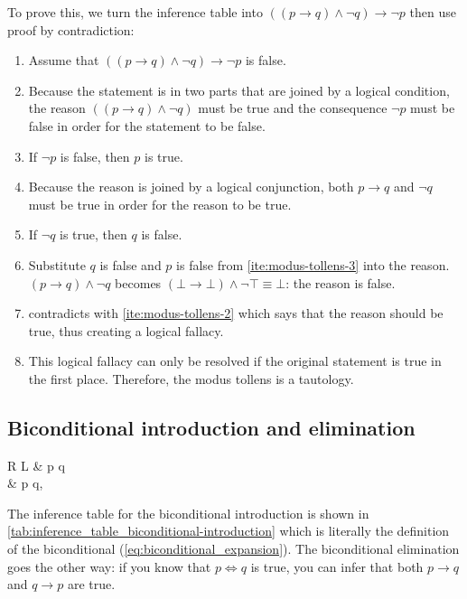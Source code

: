 To prove this, we turn the inference table into \(((p \to q) \land \neg q) \to \neg p\) then use proof by contradiction:
\begin{enumerate}[noitemsep]
  \item Assume that $((p \to q) \land \neg q) \to \neg p$ is false.
  \item\label{ite:modus-tollens-2} Because the statement is in two parts that are joined by a logical condition, the reason $((p \to q) \land \neg q)$ must be true and the consequence $\neg p$ must be false in order for the statement to be false.
  \item\label{ite:modus-tollens-3} If $\neg p$ is false, then $p$ is true.
  \item Because the reason is joined by a logical conjunction, both $p \to q$ and $\neg q$ must be true in order for the reason to be true.
  \item If $\neg q$ is true, then $q$ is false.
  \item\label{ite:modus-tollens-6} Substitute $q$ is false and $p$ is false from \cref{ite:modus-tollens-3} into the reason. $(p \to q) \land \neg q$ becomes $(\bot \to \bot) \land \neg \top \equiv \bot$: the reason is false.
  \item {} contradicts with \cref{ite:modus-tollens-2} which says that the reason should be true, thus creating a logical fallacy.
  \item This logical fallacy can only be resolved if the original statement is true in the first place. Therefore, the modus tollens is a tautology.
\end{enumerate}

\subsection{Biconditional introduction and elimination}

\begin{table}[h]
  \centering
  \begin{tblr}{R L}
               & p \to q   \\

    \therefore & p \iff q,
  \end{tblr}
  \caption{Inference table for the biconditional introduction}
  \label{tab:inference_table_biconditional-introduction}
\end{table}
The inference table for the biconditional introduction is shown in \cref{tab:inference_table_biconditional-introduction} which is literally the definition of the biconditional (\cref{eq:biconditional_expansion}). The biconditional elimination goes the other way: if you know that $p \iff q$ is true, you can infer that both $p \to q$ and $q \to p$ are true.

